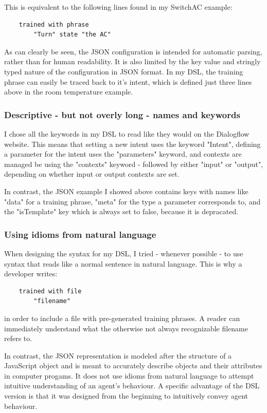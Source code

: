 This is equivalent to the following lines found in my SwitchAC example:
\begin{lstlisting}
    trained with phrase
        "Turn" state "the AC"
\end{lstlisting}
As can clearly be seen, the JSON configuration is intended for automatic parsing, rather than for human readability. It is also limited by the key value and stringly typed nature of the configuration in JSON format. In my DSL, the training phrase can easily be traced back to it's intent, which is defined just three lines above in the room temperature example.

\subsubsection{Descriptive - but not overly long - names and keywords}

I chose all the keywords in my DSL to read like they would on the Dialogflow website.
This means that setting a new intent uses the keyword "Intent", defining a parameter for the intent uses the "parameters" keyword, and contexts are managed be using the "contexts" keyword - followed by either "input" or "output", depending on whether input or output contexts are set.

In contrast, the JSON example I showed above contains keys with names like "data" for a training phrase, "meta" for the type a parameter corresponds to, and the "isTemplate" key which is always set to false, because it is depracated.

\subsubsection{Using idioms from natural language}

When designing the syntax for my DSL, I tried - whenever possible - to use syntax that reads like a normal sentence in natural language. This is why a developer writes: 
\begin{lstlisting}
    trained with file
        "filename"
\end{lstlisting}
in order to include a file with pre-generated training phrases. A reader can immediately understand what the otherwise not always recognizable filename refers to.

In contrast, the JSON representation is modeled after the structure of a JavaScript object and is meant to accurately describe objects and their attributes in computer progams. It does not use idioms from natural language to attempt intuitive understanding of an agent's behaviour.
A specific advantage of the DSL version is that it was designed from the beginning to intuitively convey agent behaviour.

